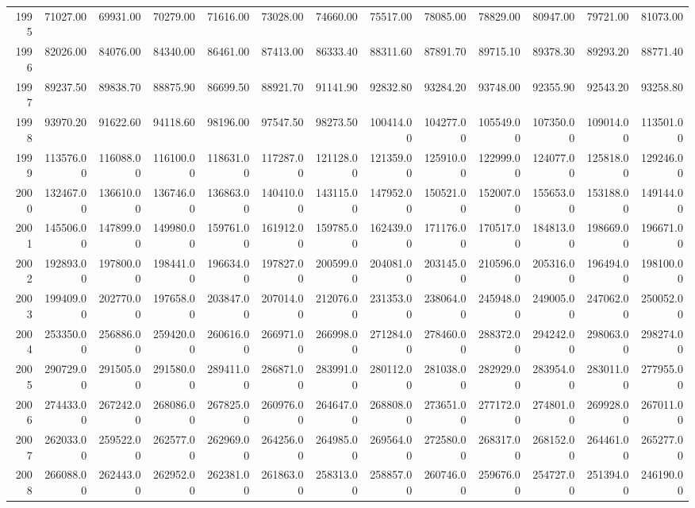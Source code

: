 \begin{longtable}{rrrrrrrrrrrrr}
  1995 & 71027.00 & 69931.00 & 70279.00 & 71616.00 & 73028.00 & 74660.00 & 75517.00 & 78085.00 & 78829.00 & 80947.00 & 79721.00 & 81073.00 \\ 
  1996 & 82026.00 & 84076.00 & 84340.00 & 86461.00 & 87413.00 & 86333.40 & 88311.60 & 87891.70 & 89715.10 & 89378.30 & 89293.20 & 88771.40 \\ 
  1997 & 89237.50 & 89838.70 & 88875.90 & 86699.50 & 88921.70 & 91141.90 & 92832.80 & 93284.20 & 93748.00 & 92355.90 & 92543.20 & 93258.80 \\ 
  1998 & 93970.20 & 91622.60 & 94118.60 & 98196.00 & 97547.50 & 98273.50 & 100414.00 & 104277.00 & 105549.00 & 107350.00 & 109014.00 & 113501.00 \\ 
  1999 & 113576.00 & 116088.00 & 116100.00 & 118631.00 & 117287.00 & 121128.00 & 121359.00 & 125910.00 & 122999.00 & 124077.00 & 125818.00 & 129246.00 \\ 
  2000 & 132467.00 & 136610.00 & 136746.00 & 136863.00 & 140410.00 & 143115.00 & 147952.00 & 150521.00 & 152007.00 & 155653.00 & 153188.00 & 149144.00 \\ 
  2001 & 145506.00 & 147899.00 & 149980.00 & 159761.00 & 161912.00 & 159785.00 & 162439.00 & 171176.00 & 170517.00 & 184813.00 & 198669.00 & 196671.00 \\ 
  2002 & 192893.00 & 197800.00 & 198441.00 & 196634.00 & 197827.00 & 200599.00 & 204081.00 & 203145.00 & 210596.00 & 205316.00 & 196494.00 & 198100.00 \\ 
  2003 & 199409.00 & 202770.00 & 197658.00 & 203847.00 & 207014.00 & 212076.00 & 231353.00 & 238064.00 & 245948.00 & 249005.00 & 247062.00 & 250052.00 \\ 
  2004 & 253350.00 & 256886.00 & 259420.00 & 260616.00 & 266971.00 & 266998.00 & 271284.00 & 278460.00 & 288372.00 & 294242.00 & 298063.00 & 298274.00 \\ 
  2005 & 290729.00 & 291505.00 & 291580.00 & 289411.00 & 286871.00 & 283991.00 & 280112.00 & 281038.00 & 282929.00 & 283954.00 & 283011.00 & 277955.00 \\ 
  2006 & 274433.00 & 267242.00 & 268086.00 & 267825.00 & 260976.00 & 264647.00 & 268808.00 & 273651.00 & 277172.00 & 274801.00 & 269928.00 & 267011.00 \\ 
  2007 & 262033.00 & 259522.00 & 262577.00 & 262969.00 & 264256.00 & 264985.00 & 269564.00 & 272580.00 & 268317.00 & 268152.00 & 264461.00 & 265277.00 \\ 
  2008 & 266088.00 & 262443.00 & 262952.00 & 262381.00 & 261863.00 & 258313.00 & 258857.00 & 260746.00 & 259676.00 & 254727.00 & 251394.00 & 246190.00 \\ 

\end{longtable}
